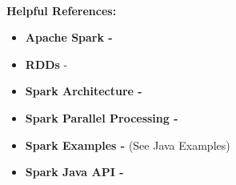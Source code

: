 \documentclass{article}
\begin{document}

\-\ \\ \noindent \textbf{Helpful References:}
\begin{itemize}[noitemsep]
    \item \textbf{Apache Spark -}  \href{https://en.wikipedia.org/wiki/Apache_Spark}{\color{blue}{https://en.wikipedia.org/wiki/Apache\_Spark}}
    \item \textbf{RDDs} - \href{https://www.tutorialspoint.com/apache_spark/apache_spark_rdd.htm}{\color{blue}{https://www.tutorialspoint.com/apache\_spark/apache\_spark\_rdd.htm}}
    \item \textbf{Spark Architecture -} \href{https://www.edureka.co/blog/spark-architecture/}{\color{blue}{https://www.edureka.co/blog/spark-architecture/}} 
    \item \textbf{Spark Parallel Processing -}
    \href{https://www.simplilearn.com/spark-parallel-processing-tutorial}{\color{blue}{https://www.simplilearn.com/spark-parallel-processing-tutorial}}
    \item \textbf{Spark Examples -} \href{https://spark.apache.org/examples.html}{\color{blue}{https://spark.apache.org/examples.html}} (See Java Examples)
    \item \textbf{Spark Java API -} \href{https://spark.apache.org/docs/latest/api/java/index.html}{\color{blue}{https://spark.apache.org/docs/latest/api/java/index.html}}
\end{itemize}
\end{document}
